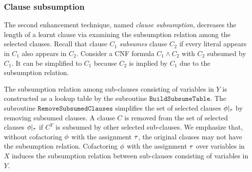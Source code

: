 \subsubsection{Clause subsumption}
The second enhancement technique, named \textit{clause subsumption},
decreases the length of a learnt clause via examining the subsumption relation among the selected clauses.
Recall that clause $C_1$ \textit{subsumes} clause $C_2$ if every literal appears in $C_1$ also appears in $C_2$.
Consider a CNF formula $C_1 \land C_2$ with $C_2$ subsumed by $C_1$.
It can be simplified to $C_1$ because $C_2$ is implied by $C_1$ due to the subsumption relation.

The subsumption relation among sub-clauses consisting of variables in $Y$ is constructed as a lookup table by the subroutine $\mathtt{BuildSubsumeTable}$.
The subroutine $\texttt{RemoveSubsumedClauses}$ simplifies the set of selected clauses $\phi|_{\tau}$ by removing subsumed clauses.
A clause $C$ is removed from the set of selected clauses $\phi|_{\tau}$ if $C^Y$ is subsumed by other selected sub-clauses.
We emphasize that, without cofactoring $\phi$ with the assignment $\tau$,
the original clauses may not have the subsumption relation.
Cofactoring $\phi$ with the assignment $\tau$ over variables in $X$ induces the subsumption relation between sub-clauses consisting of variables in $Y$.

